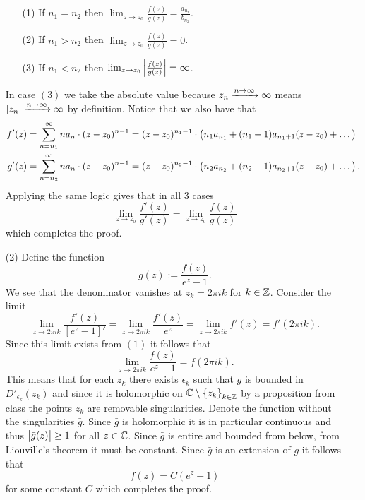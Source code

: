 \documentclass[11pt,a4paper]{article}
\begin{document}
\begin{solution}
\begin{enumerate}
\begin{enumerate}
      \item[(1)] If $n_1 = n_2$ then
        $\lim_{z \to z_0} \frac{f(z)}{g(z)} = \frac{a_{n_1}}{b_{n_2}}$. 
      \item[(2)] If $n_1 > n_2$ then
        $\lim_{z \to z_0} \frac{f(z)}{g(z)} = 0$. 
      \item[(3)] If $n_1 < n_2$ then
        $\lim_{z \to z_0} \abs{\frac{f(z)}{g(z)}} = \infty$.
    \end{enumerate}
    In case $(3)$ we take the absolute value because
    $z_n \taking{n \to \infty} \infty$ means
    $\abs{z_n} \taking{n \to \infty} \infty$ by definition.
    Notice that we also have that
    \begin{align*}
      f'(z) &= \sum_{n=n_1}^\infty na_n\cdot (z-z_0)^{n-1}
        = (z - z_0)^{n_1 - 1} \cdot 
        \del{n_1 a_{n_1} + (n_1 + 1) a_{n_1 + 1} (z - z_0) + \dots} \\
      g'(z) &= \sum_{n=n_2}^\infty na_n\cdot (z-z_0)^{n-1}
        = (z - z_0)^{n_2 - 1} \cdot 
        \del{n_2 a_{n_2} + (n_2 + 1) a_{n_2 + 1} (z - z_0) + \dots}.
    \end{align*}
    Applying the same logic gives that in all $3$ cases
    \[
      \lim_{z \to z_0} \frac{f'(z)}{g'(z)} =
      \lim_{z \to z_0} \frac{f(z)}{g(z)}
    \]
    which completes the proof.
  \item[(2)] Define the function
    \[
      g(z) := \frac{f(z)}{e^z - 1}.
    \]
    We see that the denominator vanishes at $z_k = 2 \pi i k$ for $k \in \mathbb{Z}$.
    Consider the limit
    \[
      \lim_{z \to 2 \pi i k} \frac{f'(z)}{[e^z - 1]'} =
      \lim_{z \to 2 \pi i k} \frac{f'(z)}{e^z} =
      \lim_{z \to 2 \pi i k} f'(z) = f'(2 \pi i k).
    \]
    Since this limit exists from $(1)$ it follows that
    \[
      \lim_{z \to 2 \pi i k} \frac{f(z)}{e^z - 1} = f(2 \pi i k).
    \]
    This means that for each $z_k$ there exists $\epsilon_k$ such that
    $g$ is bounded in $D'_{\epsilon_k}(z_k)$ and since it is holomorphic
    on $\mathbb{C} \setminus \left\{z_k\right\}_{k \in \mathbb{Z}}$ by a proposition from class the
    points $z_k$ are removable singularities.
    Denote the function without the singularities $\bar g$.
    Since $\bar g$ is holomorphic it is in particular continuous and thus
    $\left\lvert\bar g(z)\right\rvert \geq 1$ for all $z \in \mathbb{C}$.
    Since $\bar g$ is entire and bounded from below,
    from Liouville's theorem it must be constant.
    Since $\bar g$ is an extension of $g$ it follows that
    \[
      f(z) = C (e^z - 1)
    \]
    for some constant $C$ which completes the proof.
\end{enumerate}
\end{solution}
\end{document}
